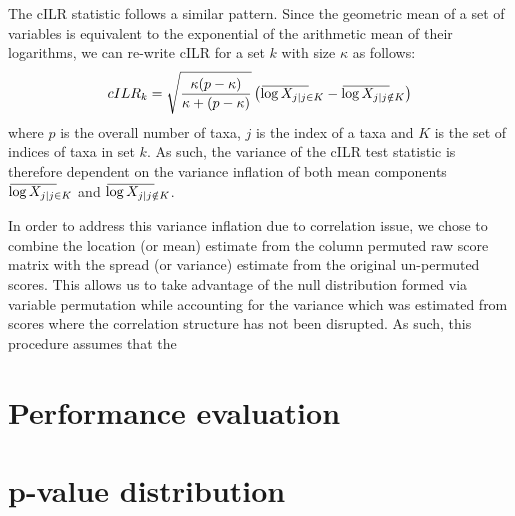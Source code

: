 \documentclass{article}
\newcommand{\overbar}[1]{\mkern 2mu\overline{\mkern-2mu#1\mkern-20mu}\mkern 20mu}
\begin{document}
The cILR statistic follows a similar pattern. Since the geometric mean of a set of variables is equivalent to the exponential of the arithmetic mean of their logarithms, we can re-write cILR for a set $k$ with size $\kappa$ as follows:  
\begin{equation}\label{eq:2}
    cILR_k = \sqrt{\frac{\kappa(p - \kappa)}{\kappa + (p - \kappa)}} \left( \overbar{\log{X_{j|j \in K}}} - \overbar{\log{X_{j|j \notin K}}} \right)   
\end{equation}
where $p$ is the overall number of taxa, $j$ is the index of a taxa and $K$ is the set of indices of taxa in set $k$. As such, the variance of the cILR test statistic is therefore dependent on the variance inflation of both mean components $\overbar{\log{X_{j|j \in K}}}$ and $\overbar{\log{X_{j|j \notin K}}}$.

In order to address this variance inflation due to correlation issue, we chose to combine the location (or mean) estimate from the column permuted raw score matrix with the spread (or variance) estimate from the original un-permuted scores. This allows us to take advantage of the null distribution formed via variable permutation while accounting for the variance which was estimated from scores where the correlation structure has not been disrupted. As such, this procedure assumes that the 

\section{Performance evaluation} 

\section{p-value distribution}

\newpage
{}

\end{document}
